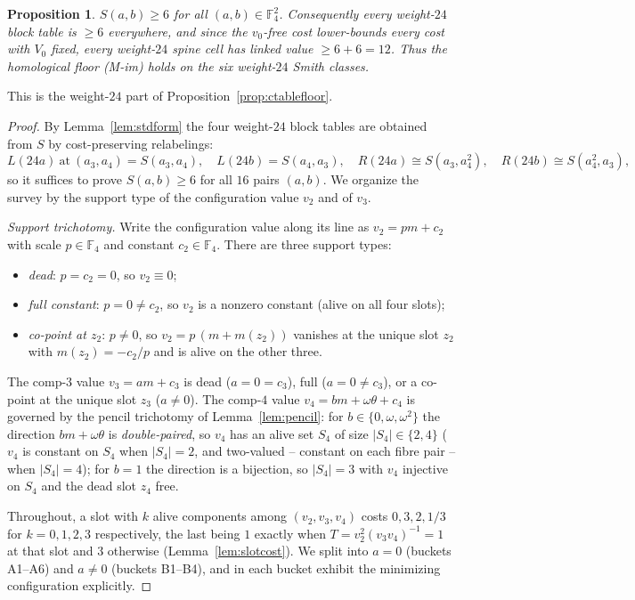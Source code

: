 \documentclass[11pt]{article}
\newcommand{\F}[1]{\mathbb{F}_{#1}}
\theoremstyle{plain}
\newtheorem{proposition}[lemma]{Proposition}
\theoremstyle{definition}
\theoremstyle{remark}
\begin{document}
\begin{proposition}\label{prop:wt24}
$S(a,b)\ge 6$ for all $(a,b)\in\F4^2$. Consequently every weight-$24$ block table is
$\ge 6$ everywhere, and since the $v_0$-free cost lower-bounds every cost with $V_0$
fixed, every weight-$24$ spine cell has linked value $\ge 6+6=12$. Thus the homological
floor (M-im) holds on the six weight-$24$ Smith classes.
\end{proposition}

This is the weight-$24$ part of Proposition~\ref{prop:ctablefloor}.

\begin{proof}
By Lemma~\ref{lem:stdform} the four weight-$24$ block tables are obtained from $S$ by
cost-preserving relabelings:
\[
  L(24a)\ \text{at}\ (a_3,a_4)=S(a_3,a_4),\quad
  L(24b)=S(a_4,a_3),\quad
  R(24a)\cong S(a_3,a_4^2),\quad
  R(24b)\cong S(a_4^2,a_3),
\]
so it suffices to prove $S(a,b)\ge 6$ for all $16$ pairs $(a,b)$. We organize the survey
by the support type of the configuration value $v_2$ and of $v_3$.

\medskip
\noindent\emph{Support trichotomy.}
Write the configuration value along its line as $v_2=pm+c_2$ with scale $p\in\F4$ and
constant $c_2\in\F4$. There are three support types:
\begin{itemize}[leftmargin=2em]
  \item \emph{dead}: $p=c_2=0$, so $v_2\equiv 0$;
  \item \emph{full constant}: $p=0\ne c_2$, so $v_2$ is a nonzero constant (alive on all
        four slots);
  \item \emph{co-point at $z_2$}: $p\ne 0$, so $v_2=p\,(m+m(z_2))$ vanishes at the unique
        slot $z_2$ with $m(z_2)=-c_2/p$ and is alive on the other three.
\end{itemize}
The comp-$3$ value $v_3=am+c_3$ is dead ($a=0=c_3$), full ($a=0\ne c_3$), or a co-point at
the unique slot $z_3$ ($a\ne 0$). The comp-$4$ value $v_4=bm+\omega\theta+c_4$ is governed
by the pencil trichotomy of Lemma~\ref{lem:pencil}: for $b\in\{0,\omega,\omega^2\}$ the
direction $bm+\omega\theta$ is \emph{double-paired}, so $v_4$ has an alive set $S_4$ of size
$|S_4|\in\{2,4\}$ ($v_4$ is constant on $S_4$ when $|S_4|=2$, and two-valued -- constant on
each fibre pair -- when $|S_4|=4$); for $b=1$ the direction is a bijection, so
$|S_4|=3$ with $v_4$ injective on $S_4$ and the dead slot $z_4$ free.

Throughout, a slot with $k$ alive components among $(v_2,v_3,v_4)$ costs $0,3,2,1/3$ for
$k=0,1,2,3$ respectively, the last being $1$ exactly when $T=v_2^2(v_3v_4)^{-1}=1$ at that
slot and $3$ otherwise (Lemma~\ref{lem:slotcost}). We split into $a=0$ (buckets
A1--A6) and $a\ne 0$ (buckets B1--B4), and in each bucket exhibit the minimizing
configuration explicitly.


\end{proof}
\end{document}
